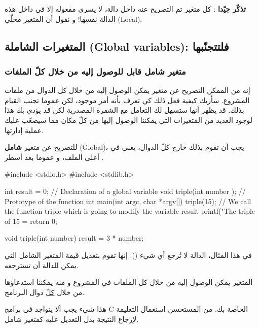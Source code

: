 \textbf{تذكّر جيّدا}
: كل متغير تم التصريح عنه داخل دالة، لا يسرى مفعوله إلا في داخل هذه الدالة نفسها! و نقول أن المتغير محلّي
(\textenglish{Local}).

\subsection{المتغيرات الشاملة (\textenglish{Global variables}): فلتتجنّبها}

\subsubsection{متغير شامل قابل للوصول إليه من خلال كلّ الملفات}

إنه من الممكن التصريح عن متغير يمكن الوصول إليه من خلال كل الدوال من ملفات المشروع.
سأريك كيفية فعل ذلك كي تعرف بأنه أمر موجود، لكن عموما تجنب القيام بذلك.
قد يظهر أنها ستسهل لك التعامل مع الشفرة المصدرية لكن قد يؤدي بك هذا لوجود العديد من المتغيرات التي يمكننا الوصول إليها من كلّ مكان مما سيصعّب عليك عملية إدارتها.

للتصريح عن متغير
\textbf{شامل}
(\textenglish{Global})،
يجب أن تقوم بذلك خارج كلّ الدوال، يعني في أعلى الملف، و عموما بعد أسطر .

\begin{Csource}
#include <stdio.h>
#include <stdlib.h>

int result = 0; // Declaration of a global variable
void triple(int number ); // Prototype of the function
int main(int argc, char *argv[])
{
	triple(15); // We call the function triple which is going to modify the variable result
	printf("The triple of 15 = %
	return 0;
}

void triple(int number)
{
	result = 3 * number;
}
\end{Csource}

في هذا المثال، الدالة
لا تُرجع أي شيء
().
إنها تقوم بتعديل قيمة المتغير الشامل
التي يمكن للدالة
أن تسترجعه.

المتغير
يمكن الوصول إليه من خلال كل الملفات في المشروع و منه يمكننا استدعاؤها من خلال
\underline{كلّ}
دوال البرنامج.

\begin{warning}
  هذا شيء يجب ألا يتواجد في برامج \textenglish{C}
الخاصة بك. من المستحسن استعمال التعليمة
لإرجاع النتيجة بدل التعديل عليه كمتغير شامل.
\end{warning}


